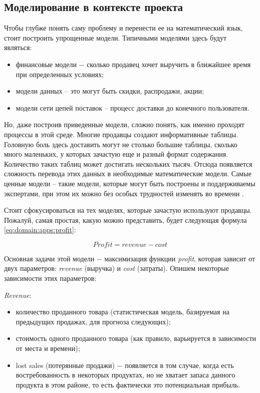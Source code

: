 \subsection{Моделирование в контексте проекта}
\label{sec:domain:modelling}

Чтобы глубже понять саму проблему и перенести ее на математический язык, стоит построить упрощенные модели. Типичными моделями здесь будут являться:
\begin{itemize}
  \item финансовые модели ​− сколько продавец хочет выручить в ближайшее время при определенных условиях;
  \item модели данных – это могут быть скидки, распродажи, акции;
  \item модели сети цепей поставок – процесс доставки до конечного пользователя.
\end{itemize}

Но, даже построив приведенные модели, сложно понять, как именно проходят процессы в этой среде. Многие продавцы создают информативные таблицы. Головную боль здесь доставить могут не столько большие таблицы, сколько много маленьких, у которых зачастую еще и разный формат содержания. Количество таких таблиц может достигать нескольких тысяч. Отсюда появляется сложность перевода этих данных в необходимые математические модели. Самые ценные модели – такие модели, которые могут быть построены и поддерживаемы экспертами, при этом их можно без особых трудностей изменять во времени \cite{kurt_lecture}.

Стоит сфокусироваться на тех моделях, которые зачастую используют продавцы. Пожалуй, самая простая, какую можно представить, будет следующая формула \ref{eq:domain:apps:profit}:

\begin{equation}
  Profit = revenue - cost
  \label{eq:domain:apps:profit}
\end{equation}

Основная задачи этой модели ​− максимизация функции \emph{profit}, которая зависит от двух параметров: \emph{revenue} (выручка) и \emph{cost} (затраты). Опишем некоторые зависимости этих параметров:

\emph{Revenue}:
\begin{itemize}
  \item количество проданного товара (статистическая модель, базируемая на предыдущих продажах, для прогноза следующих);
  \item стоимость одного проданного товара (как правило, варьируется в зависимости от места и времени);
  \item lost sales (потерянные продажи) ​− появляется в том случае, когда есть востребованность в некоторых продуктах, но не хватает запаса данного продукта в этом районе, то есть фактически это потенциальная прибыль.
\end{itemize}

